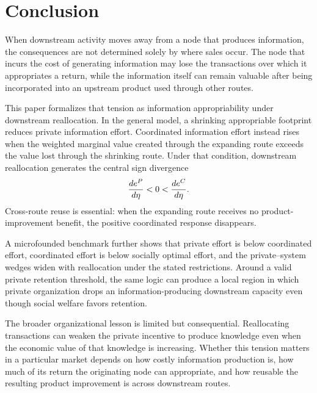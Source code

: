 \section{Conclusion}\label{sec:conclusion}

When downstream activity moves away from a node that produces information, the consequences are not determined solely by where sales occur. The node that incurs the cost of generating information may lose the transactions over which it appropriates a return, while the information itself can remain valuable after being incorporated into an upstream product used through other routes.

This paper formalizes that tension as information appropriability under downstream reallocation. In the general model, a shrinking appropriable footprint reduces private information effort. Coordinated information effort instead rises when the weighted marginal value created through the expanding route exceeds the value lost through the shrinking route. Under that condition, downstream reallocation generates the central sign divergence
\[
\frac{de^{P}}{d\eta}<0<\frac{de^{C}}{d\eta}.
\]
Cross-route reuse is essential: when the expanding route receives no product-improvement benefit, the positive coordinated response disappears.

A microfounded benchmark further shows that private effort is below coordinated effort, coordinated effort is below socially optimal effort, and the private--system wedges widen with reallocation under the stated restrictions. Around a valid private retention threshold, the same logic can produce a local region in which private organization drops an information-producing downstream capacity even though social welfare favors retention.

The broader organizational lesson is limited but consequential. Reallocating transactions can weaken the private incentive to produce knowledge even when the economic value of that knowledge is increasing. Whether this tension matters in a particular market depends on how costly information production is, how much of its return the originating node can appropriate, and how reusable the resulting product improvement is across downstream routes.
